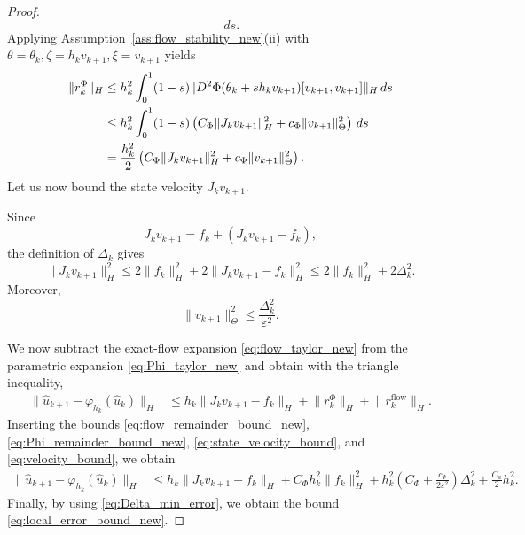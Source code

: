 \documentclass[10pt,a4paper]{amsart}
\newcommand{\norm}[1]{\lVert #1\rVert}
\newcommand{\tc}[1]{#1}
\begin{document}
\begin{proof}
\begin{equation}
    \,ds .
    \label{eq:Phi_remainder_def_new}
  \end{equation}
  Applying Assumption~\ref{ass:flow_stability_new}\textnormal{(ii)}
  with $
    \theta=\theta_k,
    \zeta=h_kv_{k+1},
    \xi=v_{k+1}$
  yields
  \begin{align}
    \norm{r_k^\Phi}_H
     & \le
    h_k^2
    \int_0^1
    (1-s)
    \norm{
    D^2\Phi(\theta_k+s h_kv_{k+1})
    [v_{k+1},v_{k+1}]
    }_H
    \,ds
    \notag \\
     & \le
    h_k^2
    \int_0^1
    (1-s)
    \left(
    C_\Phi\norm{J_kv_{k+1}}_H^2
    +
    c_\Phi\norm{v_{k+1}}_\Theta^2
    \right)
    \,ds
    \notag \\
     & =
    \frac{h_k^2}{2}
    \left(
    C_\Phi\norm{J_kv_{k+1}}_H^2
    +
    c_\Phi\norm{v_{k+1}}_\Theta^2
    \right).
    \label{eq:Phi_remainder_bound_new}
  \end{align}
  Let us now bound the state velocity $J_kv_{k+1}$.
    \tc{
      Since
      \begin{equation}
        J_kv_{k+1}=f_k+(J_kv_{k+1}-f_k),
      \end{equation}
      the definition of $\Delta_k$ gives
      \begin{equation} \label{eq:state_velocity_bound}
        \norm{J_kv_{k+1}}_H^2
        \le
        2\norm{f_k}_H^2
        +
        2\norm{J_kv_{k+1}-f_k}_H^2
        \le
        2\norm{f_k}_H^2
        +
        2\Delta_k^2.
      \end{equation}
      Moreover,
      \begin{equation} \label{eq:velocity_bound}
        \norm{v_{k+1}}_\Theta^2
        \le
        \frac{\Delta_k^2}{\varepsilon^2}.
      \end{equation}
    }

  We now subtract the exact-flow expansion
  \eqref{eq:flow_taylor_new} from the parametric expansion
  \eqref{eq:Phi_taylor_new} and obtain with the triangle inequality,
  \begin{align}
    \norm{\hat u_{k+1}-\varphi_{h_k}(\hat u_k)}_H
     & \le
    h_k\norm{J_kv_{k+1}-f_k}_H
    +
    \norm{r_k^\Phi}_H
    +
    \norm{r_k^{\mathrm{flow}}}_H .
    \label{eq:local_difference_bound_new}
  \end{align}
  Inserting the bounds
  \eqref{eq:flow_remainder_bound_new},
  \eqref{eq:Phi_remainder_bound_new},
  \tc{ \eqref{eq:state_velocity_bound},
      and \eqref{eq:velocity_bound}}, we obtain
  \begin{align}
    \norm{\hat u_{k+1}-\varphi_{h_k}(\hat u_k)}_H
     & \le
    h_k\norm{J_kv_{k+1}-f_k}_H
    +
    C_\Phi h_k^2\norm{f_k}_H^2
    +
    \tc{
    h_k^2
    \left(
    C_\Phi+\frac{c_\Phi}{2\varepsilon^2}
    \right)\Delta_k^2}
    +
    \frac{C_a}{2}h_k^2 .
    \label{eq:local_error_before_defect_new}
  \end{align}
  Finally, by using \eqref{eq:Delta_min_error}, we obtain the bound \eqref{eq:local_error_bound_new}.
\end{proof}
\end{document}
